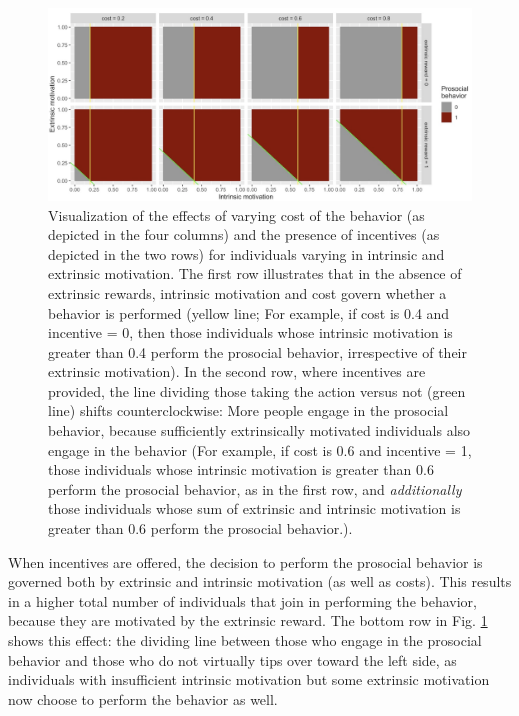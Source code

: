 \documentclass[AER]{AEA}
\begin{document}
\begin{figure}[h]
    \centering
    \includegraphics[width=\textwidth]{images/model_IM_EM.png}
    \caption{Visualization of the effects of varying cost of the behavior (as depicted in the four columns) and the presence of incentives (as depicted in the two rows) for individuals varying in intrinsic and extrinsic motivation. The first row illustrates that in the absence of extrinsic rewards, intrinsic motivation and cost govern whether a behavior is performed (yellow line; For example, if cost is 0.4 and incentive = 0, then those individuals whose intrinsic motivation is greater than 0.4 perform the prosocial behavior, irrespective of their extrinsic motivation). In the second row, where incentives are provided, the line dividing those taking the action versus not (green line) shifts counterclockwise: More people engage in the prosocial behavior, because sufficiently extrinsically motivated individuals also engage in the behavior (For example, if cost is 0.6 and incentive = 1, those individuals whose intrinsic motivation is greater than 0.6 perform the prosocial behavior, as in the first row, and \textit{additionally} those individuals whose sum of extrinsic and intrinsic motivation is greater than 0.6 perform the prosocial behavior.).}
    \label{fig:model_IM_EM}
\end{figure}

When incentives are offered, the decision to perform the prosocial behavior is governed both by extrinsic and intrinsic motivation (as well as costs). This results in a higher total number of individuals that join in performing the behavior, because they are motivated by the extrinsic reward. The bottom row in Fig. \ref{fig:model_IM_EM} shows this effect: the dividing line between those who engage in the prosocial behavior and those who do not virtually tips over toward the left side, as individuals with insufficient intrinsic motivation but some extrinsic motivation now choose to perform the behavior as well. 
\end{document}
